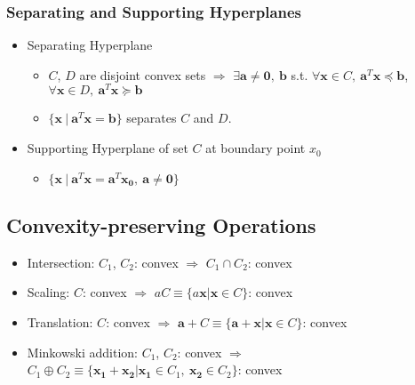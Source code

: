 \subsubsection*{Separating and Supporting Hyperplanes}
\begin{itemize}
    \item Separating Hyperplane
    \begin{itemize}
        \item $C$, $D$ are disjoint convex sets $\Rightarrow$
            $\exists \mathbf{a} \neq \mathbf{0},~\mathbf{b}$ s.t.
            $\forall \mathbf{x} \in C,~\mathbf{a}^T\mathbf{x} \preceq \mathbf{b}$,
            $\forall \mathbf{x} \in D,~\mathbf{a}^T\mathbf{x} \succeq \mathbf{b}$
        \item $\{\mathbf{x}~|~\mathbf{a}^T\mathbf{x} = \mathbf{b}\}$ separates $C$ and $D$.
    \end{itemize}
    \item Supporting Hyperplane of set $C$ at boundary point $x_0$
    \begin{itemize}
        \item $\{\mathbf{x}~|~\mathbf{a}^T\mathbf{x} = \mathbf{a}^T\mathbf{x_0},~\mathbf{a}\neq\mathbf{0}\}$
    \end{itemize}
\end{itemize}

\subsection{Convexity-preserving Operations}
\begin{itemize}
    \item Intersection: $C_1$, $C_2$: convex $\Rightarrow$ $C_1 \cap C_2$: convex
    \item Scaling: $C$: convex $\Rightarrow$ $aC \equiv \{a\mathbf{x}|\mathbf{x} \in C\}$: convex
    \item Translation: $C$: convex $\Rightarrow$ $\mathbf{a} + C \equiv \{\mathbf{a}+\mathbf{x}|\mathbf{x}\in C\}$: convex
    \item Minkowski addition: $C_1$, $C_2$: convex $\Rightarrow$ $C_1 \oplus C_2 \equiv \{\mathbf{x_1}+\mathbf{x_2}|\mathbf{x_1}\in C_1,~\mathbf{x_2}\in C_2\}$: convex
\end{itemize}

